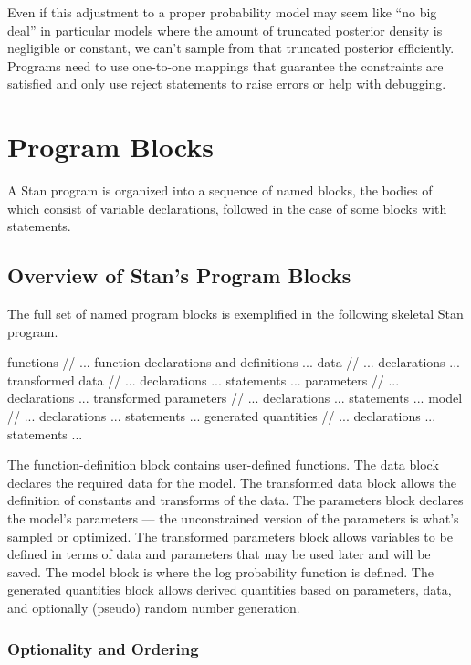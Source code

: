 Even if this adjustment to a proper probability model may seem like
``no big deal'' in particular models where the amount of truncated
posterior density is negligible or constant, we can't sample from that
truncated posterior efficiently.  Programs need to use one-to-one
mappings that guarantee the constraints are satisfied and only use
reject statements to raise errors or help with debugging.



\chapter{Program Blocks}\label{blocks.chapter}

\noindent
A Stan program is organized into a sequence of named blocks, the
bodies of which consist of variable declarations, followed in the case
of some blocks with statements.

\section{Overview of Stan's Program Blocks}

The full set of named program blocks is exemplified in the following
skeletal Stan program.
%
\begin{stancode}
functions {
  // ... function declarations and definitions ...
}
data {
  // ... declarations ...
}
transformed data {
   // ... declarations ... statements ...
}
parameters {
   // ... declarations ...
}
transformed parameters {
   // ... declarations ... statements ...
}
model {
   // ... declarations ... statements ...
}
generated quantities {
   // ... declarations ... statements ...
}
\end{stancode}
%
The function-definition block contains user-defined functions.  The
data block declares the required data for the model.  The transformed
data block allows the definition of constants and transforms of the
data.  The parameters block declares the model's parameters --- the
unconstrained version of the parameters is what's sampled or
optimized.  The transformed parameters block allows variables to be
defined in terms of data and parameters that may be used later and
will be saved.  The model block is where the log probability function
is defined.  The generated quantities block allows derived quantities
based on parameters, data, and optionally (pseudo) random number
generation.


\subsection{Optionality and Ordering}

